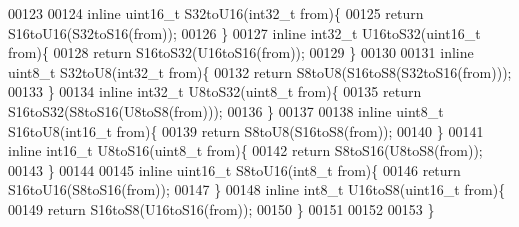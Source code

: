 \begin{DoxyCode}
00123 
00124 \textcolor{keyword}{inline} uint16\_t S32toU16(int32\_t from)\{
00125   \textcolor{keywordflow}{return} S16toU16(S32toS16(from));
00126 \}
00127 \textcolor{keyword}{inline} int32\_t U16toS32(uint16\_t from)\{
00128   \textcolor{keywordflow}{return} S16toS32(U16toS16(from));
00129 \}
00130 
00131 \textcolor{keyword}{inline} uint8\_t S32toU8(int32\_t from)\{
00132   \textcolor{keywordflow}{return} S8toU8(S16toS8(S32toS16(from)));
00133 \}
00134 \textcolor{keyword}{inline} int32\_t U8toS32(uint8\_t from)\{
00135   \textcolor{keywordflow}{return} S16toS32(S8toS16(U8toS8(from)));
00136 \}
00137 
00138 \textcolor{keyword}{inline} uint8\_t S16toU8(int16\_t from)\{
00139   \textcolor{keywordflow}{return} S8toU8(S16toS8(from));
00140 \}
00141 \textcolor{keyword}{inline} int16\_t U8toS16(uint8\_t from)\{
00142   \textcolor{keywordflow}{return} S8toS16(U8toS8(from));
00143 \}
00144 
00145 \textcolor{keyword}{inline} uint16\_t S8toU16(int8\_t from)\{
00146   \textcolor{keywordflow}{return} S16toU16(S8toS16(from));
00147 \}
00148 \textcolor{keyword}{inline} int8\_t U16toS8(uint16\_t from)\{
00149   \textcolor{keywordflow}{return} S16toS8(U16toS16(from));
00150 \}
00151 
00152 
00153 \}
\end{DoxyCode}
